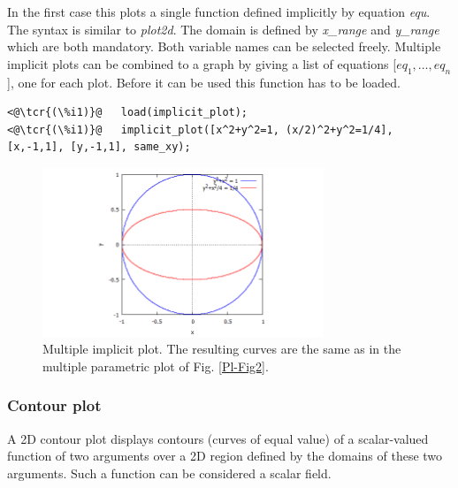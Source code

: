 \documentclass[../Maxima_Workbook.tex]{subfiles}
\begin{document}
\lz In the first case this plots a single function defined implicitly by equation \emph{equ}. The syntax is similar to \emph{plot2d}. The domain is defined by \emph{x\_range} and \emph{y\_range} which are both mandatory. Both variable names can be selected freely. Multiple implicit plots can be combined to a graph by giving a list of equations [$ eq_1,\dots, eq_n $], one for each plot. Before it can be used this function has to be loaded.

\lz \begin{lstlisting}
<@\tcr{(\%i1)}@   load(implicit_plot);
<@\tcr{(\%i1)}@   implicit_plot([x^2+y^2=1, (x/2)^2+y^2=1/4], [x,-1,1], [y,-1,1], same_xy);
\end{lstlisting}
\vspace{-2mm} 

\begin{figure}
	\centering
	\includegraphics[width=0.75\textwidth]{Pl_implicit_plot.png}
	\caption{Multiple implicit plot. The resulting curves are the same as in the multiple parametric plot of Fig. \ref{Pl-Fig2}.}
	\label{Pl-Fig3}
\end{figure}

\subsubsection{Contour plot}

A 2D contour plot displays contours (curves of equal value) of a scalar-valued function of two arguments over a 2D region defined by the domains of these two arguments. Such a function can be considered a scalar field.

\lz {} \hfill \tcr{[function]}

 \hfill \tcr{[function]}
\end{document}
